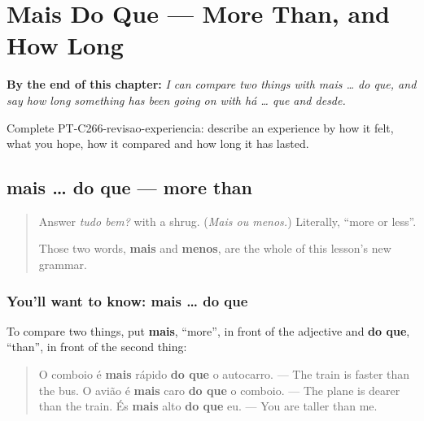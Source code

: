 
\chapter{Mais Do Que --- More Than, and How Long}
\label{ch:pt-more-than-and-how-long}

\begin{chapteropening}
\textbf{By the end of this chapter:} \emph{I can compare two things with mais … do que, and say how long something has been going on with há … que and desde.}

Complete PT-C266-revisao-experiencia: describe an experience by how it felt, what you hope, how it compared and how long it has lasted.
\end{chapteropening}

\section[mais … do que]{mais … do que — more than}

\label{lesson:PT-C266-mais-do-que}



\begin{quote}
Answer \emph{tudo bem?} with a shrug. (\emph{Mais ou menos.}) Literally, \textquotedblleft{}more or less\textquotedblright{}.

Those two words, \textbf{mais} and \textbf{menos}, are the whole of this lesson's new grammar.
\end{quote}

\subsection*{You'll want to know: mais … do que}
To compare two things, put \textbf{mais}, \textquotedblleft{}more\textquotedblright{}, in front of the adjective and \textbf{do que}, \textquotedblleft{}than\textquotedblright{}, in front of the second thing:

\begin{quote}
O comboio é \textbf{mais} rápido \textbf{do que} o autocarro. — The train is faster than the bus. O avião é \textbf{mais} caro \textbf{do que} o comboio. — The plane is dearer than the train. És \textbf{mais} alto \textbf{do que} eu. — You are taller than me.
\end{quote}


